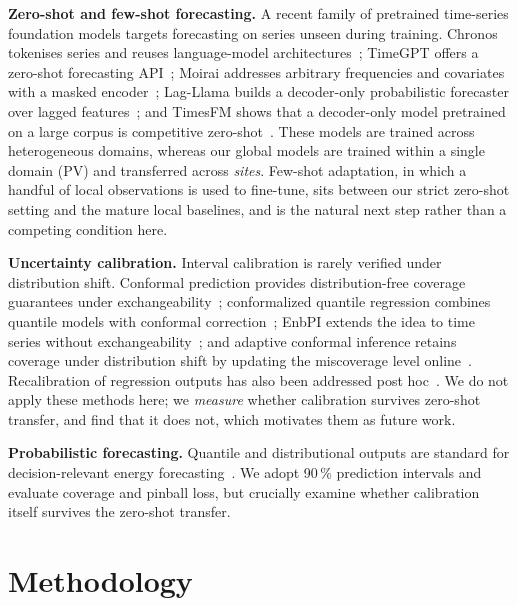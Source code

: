 \documentclass[conference]{IEEEtran}
\begin{document}
\textbf{Zero-shot and few-shot forecasting.} A recent family of pretrained time-series
foundation models targets forecasting on series unseen during training. Chronos tokenises
series and reuses language-model architectures~\cite{Ansari2024}; TimeGPT offers a
zero-shot forecasting API~\cite{Garza2023}; Moirai addresses arbitrary frequencies and
covariates with a masked encoder~\cite{Woo2024}; Lag-Llama builds a decoder-only probabilistic
forecaster over lagged features~\cite{Rasul2023}; and TimesFM shows that a decoder-only model
pretrained on a large corpus is competitive zero-shot~\cite{Das2024}. These models are trained
across heterogeneous domains, whereas our global models are trained within a single domain
(PV) and transferred across \emph{sites}. Few-shot adaptation, in which a handful of local
observations is used to fine-tune, sits between our strict zero-shot setting and the mature
local baselines, and is the natural next step rather than a competing condition here.

\textbf{Uncertainty calibration.} Interval calibration is rarely verified under distribution
shift. Conformal prediction provides distribution-free coverage guarantees under
exchangeability~\cite{Vovk2005}; conformalized quantile regression combines quantile models
with conformal correction~\cite{Romano2019}; EnbPI extends the idea to time series without
exchangeability~\cite{Xu2021}; and adaptive conformal inference retains coverage under
distribution shift by updating the miscoverage level online~\cite{Gibbs2021}. Recalibration of
regression outputs has also been addressed post hoc~\cite{Kuleshov2018}. We do not apply these
methods here; we \emph{measure} whether calibration survives zero-shot transfer, and find that
it does not, which motivates them as future work.

\textbf{Probabilistic forecasting.} Quantile and distributional outputs are standard for
decision-relevant energy forecasting~\cite{Salinas2020,Benidis2022}. We adopt 90\,\%
prediction intervals and evaluate coverage and pinball loss, but crucially examine whether
calibration itself survives the zero-shot transfer.

\section{Methodology}
\end{document}
